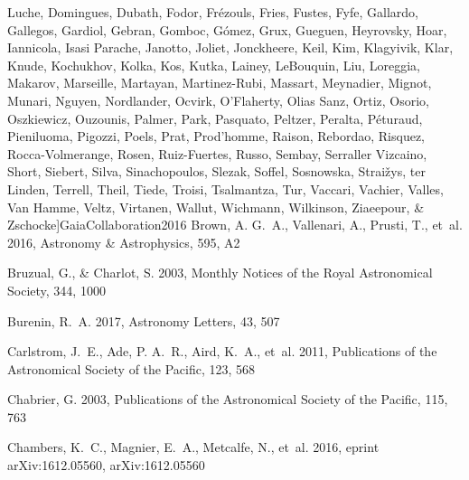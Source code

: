 \documentclass[apj, revtex4-1]{emulateapj}
\begin{document}
\begin{thebibliography}{}
{{  Luche}, Domingues, Dubath, Fodor, Fr{\'{e}}zouls, Fries, Fustes, Fyfe,
  Gallardo, Gallegos, Gardiol, Gebran, Gomboc, G{\'{o}}mez, Grux, Gueguen,
  Heyrovsky, Hoar, Iannicola, {Isasi Parache}, Janotto, Joliet, Jonckheere,
  Keil, Kim, Klagyivik, Klar, Knude, Kochukhov, Kolka, Kos, Kutka, Lainey,
  LeBouquin, Liu, Loreggia, Makarov, Marseille, Martayan, Martinez-Rubi,
  Massart, Meynadier, Mignot, Munari, Nguyen, Nordlander, Ocvirk, O'Flaherty,
  {Olias Sanz}, Ortiz, Osorio, Oszkiewicz, Ouzounis, Palmer, Park, Pasquato,
  Peltzer, Peralta, P{\'{e}}turaud, Pieniluoma, Pigozzi, Poels, Prat,
  Prod'homme, Raison, Rebordao, Risquez, Rocca-Volmerange, Rosen, Ruiz-Fuertes,
  Russo, Sembay, {Serraller Vizcaino}, Short, Siebert, Silva, Sinachopoulos,
  Slezak, Soffel, Sosnowska, Strai{\v{z}}ys, ter Linden, Terrell, Theil, Tiede,
  Troisi, Tsalmantza, Tur, Vaccari, Vachier, Valles, {Van Hamme}, Veltz,
  Virtanen, Wallut, Wichmann, Wilkinson, Ziaeepour, \&
  Zschocke}]{GaiaCollaboration2016}
Brown, A. G.~A., Vallenari, A., Prusti, T., {et~al.} 2016, Astronomy {\&}
  Astrophysics, 595, A2

Bruzual, G., \& Charlot, S. 2003, Monthly Notices of the Royal Astronomical
  Society, 344, 1000

Burenin, R.~A. 2017, Astronomy Letters, 43, 507

Carlstrom, J.~E., Ade, P. A.~R., Aird, K.~A., {et~al.} 2011, Publications of
  the Astronomical Society of the Pacific, 123, 568

Chabrier, G. 2003, Publications of the Astronomical Society of the Pacific,
  115, 763

Chambers, K.~C., Magnier, E.~A., Metcalfe, N., {et~al.} 2016, eprint
  arXiv:1612.05560, arXiv:1612.05560


\end{thebibliography}
\end{document}

